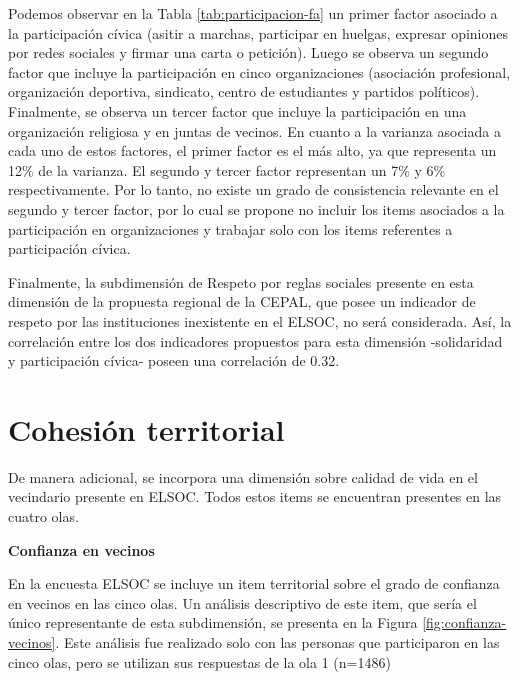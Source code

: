 \documentclass[
  12pt,
]{book}
\begin{document}
Podemos observar en la Tabla \ref{tab:participacion-fa} un primer factor asociado a la participación cívica (asitir a marchas, participar en huelgas, expresar opiniones por redes sociales y firmar una carta o petición). Luego se observa un segundo factor que incluye la participación en cinco organizaciones (asociación profesional, organización deportiva, sindicato, centro de estudiantes y partidos políticos). Finalmente, se observa un tercer factor que incluye la participación en una organización religiosa y en juntas de vecinos. En cuanto a la varianza asociada a cada uno de estos factores, el primer factor es el más alto, ya que representa un 12\% de la varianza. El segundo y tercer factor representan un 7\% y 6\% respectivamente. Por lo tanto, no existe un grado de consistencia relevante en el segundo y tercer factor, por lo cual se propone no incluir los items asociados a la participación en organizaciones y trabajar solo con los items referentes a participación cívica.

Finalmente, la subdimensión de Respeto por reglas sociales presente en esta dimensión de la propuesta regional de la CEPAL, que posee un indicador de respeto por las instituciones inexistente en el ELSOC, no será considerada. Así, la correlación entre los dos indicadores propuestos para esta dimensión -solidaridad y participación cívica- poseen una correlación de 0.32.

\hypertarget{cohesiuxf3n-territorial}{%
\section{Cohesión territorial}\label{cohesiuxf3n-territorial}}

De manera adicional, se incorpora una dimensión sobre calidad de vida en el vecindario presente en ELSOC. Todos estos items se encuentran presentes en las cuatro olas.

\textbf{Confianza en vecinos}

En la encuesta ELSOC se incluye un item territorial sobre el grado de confianza en vecinos en las cinco olas. Un análisis descriptivo de este item, que sería el único representante de esta subdimensión, se presenta en la Figura \ref{fig:confianza-vecinos}. Este análisis fue realizado solo con las personas que participaron en las cinco olas, pero se utilizan sus respuestas de la ola 1 (n=1486)
\end{document}
